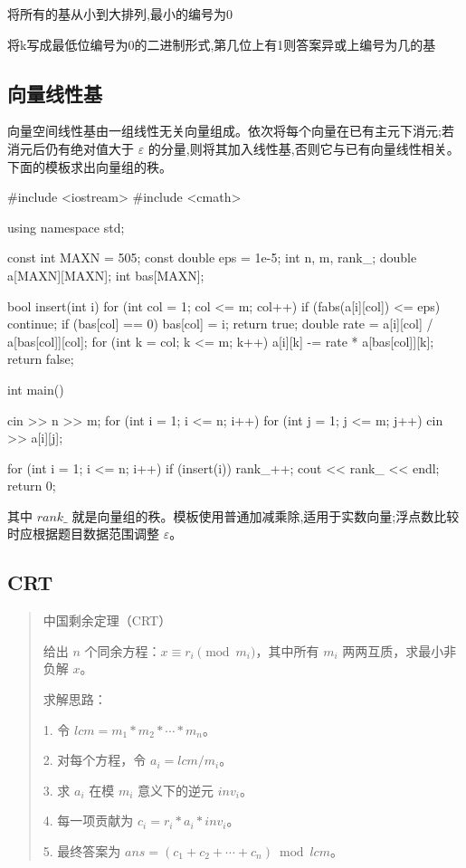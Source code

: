 \documentclass[UTF8,a4paper,11pt]{ctexart}
\newcommand{\topic}[1]{%
  \par\needspace{3\baselineskip}\vspace{0.45em}%
  \noindent{\bfseries\color{Primary}#1}\par\vspace{0.12em}%
}
\begin{document}
\topic{第 k 小异或和}

将所有的基从小到大排列,最小的编号为0

将k写成最低位编号为0的二进制形式,第几位上有1则答案异或上编号为几的基

\subsection{向量线性基}

\topic{普通消元}

向量空间线性基由一组线性无关向量组成。依次将每个向量在已有主元下消元;若消元后仍有绝对值大于 $\varepsilon$ 的分量,则将其加入线性基,否则它与已有向量线性相关。下面的模板求出向量组的秩。

\begin{CodeBlock}
#include <iostream>
#include <cmath>

using namespace std;

const int MAXN = 505;
const double eps = 1e-5;
int n, m, rank_;
double a[MAXN][MAXN];
int bas[MAXN];

bool insert(int i) {
    for (int col = 1; col <= m; col++) {
        if (fabs(a[i][col]) <= eps)
            continue;
        if (bas[col] == 0) {
            bas[col] = i;
            return true;
        }
        double rate = a[i][col] / a[bas[col]][col];
        for (int k = col; k <= m; k++)
            a[i][k] -= rate * a[bas[col]][k];
    }
    return false;
}

int main() {
    cin >> n >> m;
    for (int i = 1; i <= n; i++)
        for (int j = 1; j <= m; j++)
            cin >> a[i][j];

    for (int i = 1; i <= n; i++) {
        if (insert(i))
            rank_++;
    }
    cout << rank_ << endl;
    return 0;
}
\end{CodeBlock}

其中 $rank\_$ 就是向量组的秩。模板使用普通加减乘除,适用于实数向量;浮点数比较时应根据题目数据范围调整 $\varepsilon$。

\subsection{CRT}

\begin{quote}
中国剩余定理（CRT）\par
给出 $n$ 个同余方程：$x \equiv r_i \pmod{m_i}$，其中所有 $m_i$ 两两互质，求最小非负解 $x$。\par
\smallskip
求解思路：\par
1. 令 $lcm = m_1 * m_2 * \cdots * m_n$。\par
2. 对每个方程，令 $a_i = lcm / m_i$。\par
3. 求 $a_i$ 在模 $m_i$ 意义下的逆元 $inv_i$。\par
4. 每一项贡献为 $c_i = r_i * a_i * inv_i$。\par
5. 最终答案为 $ans = (c_1 + c_2 + \cdots + c_n) \bmod lcm$。\par
\end{quote}
\end{document}
